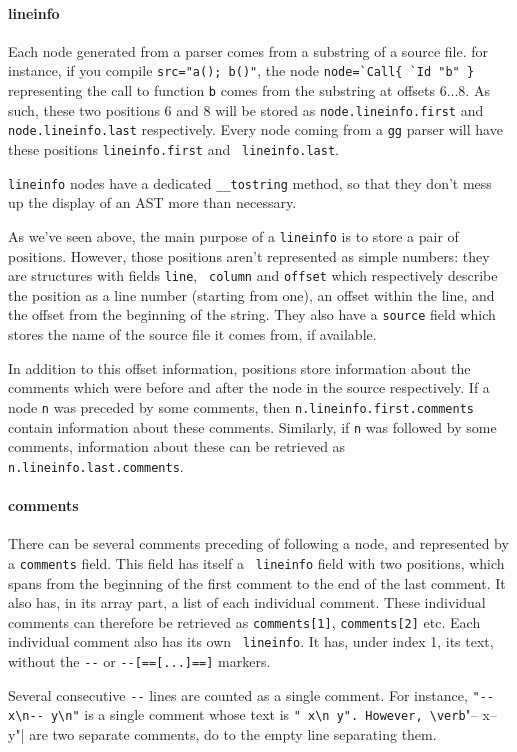 \paragraph{lineinfo}
Each node generated from a parser comes from a substring of a source
file. for instance, if you compile {\tt src="a(); b()"}, the node
\verb|node=`Call{ `Id "b" }| representing the call to function {\tt b}
comes from the substring at offsets 6...8. As such, these two
positions 6 and 8 will be stored as {\tt node.lineinfo.first} and {\tt
  node.lineinfo.last} respectively. Every node coming from a {\tt gg}
parser will have these positions {\tt lineinfo.first} and {\tt
  lineinfo.last}.

{\tt lineinfo} nodes have a dedicated \verb|__tostring| method, so
that they don't mess up the display of an AST more than necessary.

As we've seen above, the main purpose of a {\tt lineinfo} is to store
a pair of positions. However, those positions aren't represented as
simple numbers: they are structures with fields {\tt line}, {\tt
column} and {\tt offset} which respectively describe the position as a
line number (starting from one), an offset within the line, and the
offset from the beginning of the string. They also have a {\tt source}
field which stores the name of the source file it comes from, if
available.

In addition to this offset information, positions store information
about the comments which were before and after the node in the source
respectively. If a node {\tt n} was preceded by some comments, then
{\tt n.lineinfo.first.comments} contain information about these
comments. Similarly, if {\tt n} was followed by some comments,
information about these can be retrieved as {\tt
n.lineinfo.last.comments}. 

\paragraph{comments}
There can be several comments preceding of following a node, and
represented by a {\tt comments} field. This field has itself a {\tt
lineinfo} field with two positions, which spans from the beginning of
the first comment to the end of the last comment. It also has, in its
array part, a list of each individual comment. These individual
comments can therefore be retrieved as \verb|comments[1]|,
\verb|comments[2]| etc. Each individual comment also has its own {\tt
  lineinfo}. It has, under index 1, its text, without the \verb|--| or
\verb|--[==[...]==]| markers.

Several consecutive \verb|--| lines are counted as a  single
comment. For instance, \verb|"-- x\n-- y\n"| is a single comment whose
text is \verb|" x\n y". However, \verb|"-- x\n\n-- y\n"| are two
separate comments, do to the empty line separating them.




